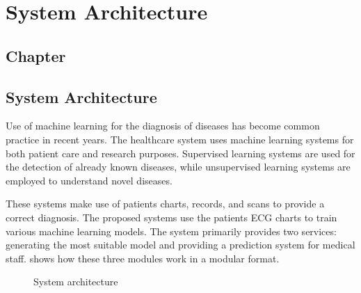 \thispagestyle{fancy}
\chapter{System Architecture} \label{ch:system_architecture}
\section*{\centering Chapter \thechapter}
\section*{\centering System Architecture}

Use of machine learning for the diagnosis of diseases has become common practice in recent years. The healthcare system uses machine learning systems for both patient care and research purposes. Supervised learning systems are used for the detection of already known diseases, while unsupervised learning systems are employed to understand novel diseases.

These systems make use of patients charts, records, and scans to provide a correct diagnosis. The proposed systems use the patients ECG charts to train various machine learning models. The system primarily provides two services: generating the most suitable model and providing a prediction system for medical staff.  shows how these three modules work in a modular format.

\begin{figure}[H]
  \centering
  \caption{System architecture}
  \label{fig:system_architecture}
\end{figure}

